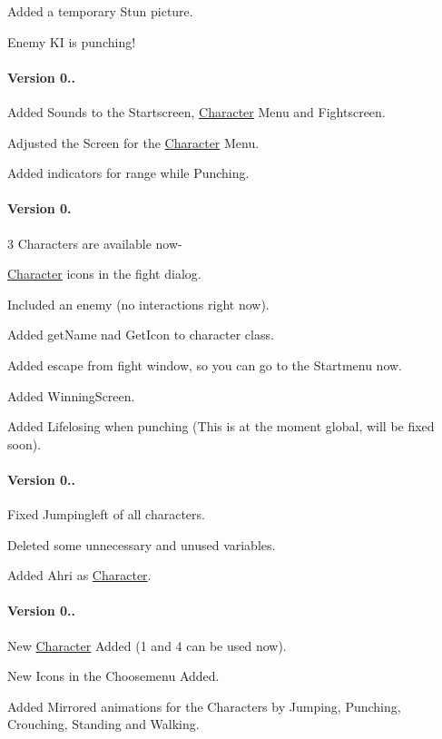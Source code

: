 Added a temporary Stun picture.

Enemy K\+I is punching!

\paragraph*{Version 0..}

Added Sounds to the Startscreen, \hyperlink{class_character}{Character} Menu and Fightscreen.

Adjusted the Screen for the \hyperlink{class_character}{Character} Menu.

Added indicators for range while Punching.

\paragraph*{Version 0.}

3 Characters are available now-\/

\hyperlink{class_character}{Character} icons in the fight dialog.

Included an enemy (no interactions right now).

Added get\+Name nad Get\+Icon to character class.

Added escape from fight window, so you can go to the Startmenu now.

Added Winning\+Screen.

Added Lifelosing when punching (This is at the moment global, will be fixed soon).

\paragraph*{Version 0..}

Fixed Jumpingleft of all characters.

Deleted some unnecessary and unused variables.

Added Ahri as \hyperlink{class_character}{Character}.

\paragraph*{Version 0..}

New \hyperlink{class_character}{Character} Added (1 and 4 can be used now).

New Icons in the Choosemenu Added.

Added Mirrored animations for the Characters by Jumping, Punching, Crouching, Standing and Walking.

